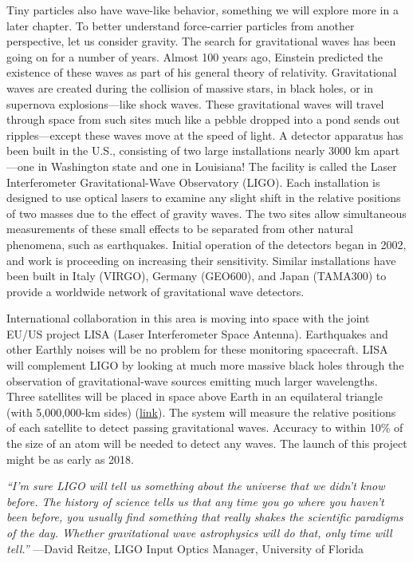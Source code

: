 \documentclass[
]{book}
\begin{document}
Tiny particles also have wave-like behavior, something we will explore
more in a later chapter. To better understand force-carrier particles
from another perspective, let us consider gravity. The search for
gravitational waves has been going on for a number of years. Almost 100
years ago, Einstein predicted the existence of these waves as part of
his general theory of relativity. Gravitational waves are created during
the collision of massive stars, in black holes, or in supernova
explosions---like shock waves. These gravitational waves will travel
through space from such sites much like a pebble dropped into a pond
sends out ripples---except these waves move at the speed of light. A
detector apparatus has been built in the U.S., consisting of two large
installations nearly 3000 km apart---one in Washington state and one in
Louisiana! The facility is called the Laser Interferometer
Gravitational-Wave Observatory (LIGO). Each installation is designed to
use optical lasers to examine any slight shift in the relative positions
of two masses due to the effect of gravity waves. The two sites allow
simultaneous measurements of these small effects to be separated from
other natural phenomena, such as earthquakes. Initial operation of the
detectors began in 2002, and work is proceeding on increasing their
sensitivity. Similar installations have been built in Italy (VIRGO),
Germany (GEO600), and Japan (TAMA300) to provide a worldwide network of
gravitational wave detectors.

International collaboration in this area is moving into space with the
joint EU/US project LISA (Laser Interferometer Space Antenna).
Earthquakes and other Earthly noises will be no problem for these
monitoring spacecraft. LISA will complement LIGO by looking at much more
massive black holes through the observation of gravitational-wave
sources emitting much larger wavelengths. Three satellites will be
placed in space above Earth in an equilateral triangle (with
5,000,000-km sides)
(\protect\hyperlink{import-auto-id3032532}{link}). The system
will measure the relative positions of each satellite to detect passing
gravitational waves. Accuracy to within 10\% of the size of an atom will
be needed to detect any waves. The launch of this project might be as
early as 2018.

\emph{``I'm sure LIGO will tell us something about the universe that we didn't
know before. The history of science tells us that any time you go where
you haven't been before, you usually find something that really shakes
the scientific paradigms of the day. Whether gravitational wave
astrophysics will do that, only time will tell.''} ---David Reitze, LIGO
Input Optics Manager, University of Florida
\end{document}
